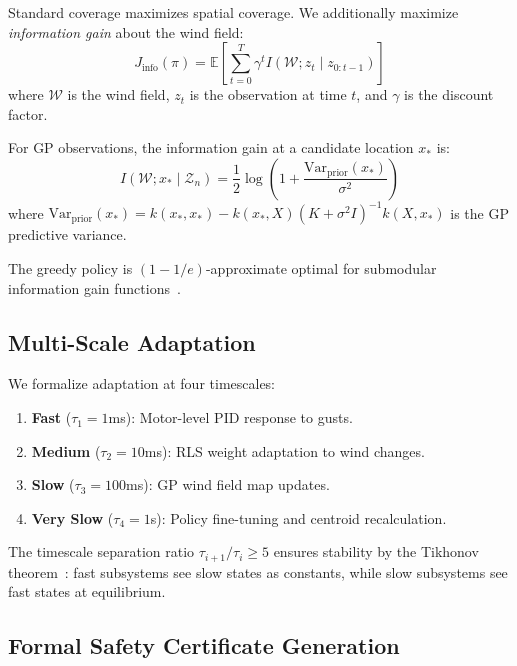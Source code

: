 \documentclass[11pt,twocolumn]{article}
\theoremstyle{definition}
\newcommand{\EE}{\mathbb{E}}
\newcommand{\cW}{\mathcal{W}}
\newcommand{\cZ}{\mathcal{Z}}
\begin{document}
Standard coverage maximizes spatial coverage. We additionally maximize \emph{information gain} about the wind field:
\begin{equation}
\label{eq:info_objective}
J_{\text{info}}(\pi) = \EE\left[\sum_{t=0}^{T} \gamma^t I(\cW; z_t \mid z_{0:t-1})\right]
\end{equation}
where $\cW$ is the wind field, $z_t$ is the observation at time $t$, and $\gamma$ is the discount factor.

For GP observations, the information gain at a candidate location $x_*$ is:
\begin{equation}
I(\cW; x_* \mid \cZ_n) = \frac{1}{2}\log\left(1 + \frac{\text{Var}_{\text{prior}}(x_*)}{\sigma^2}\right)
\end{equation}
where $\text{Var}_{\text{prior}}(x_*) = k(x_*, x_*) - k(x_*, X)(K + \sigma^2 I)^{-1}k(X, x_*)$ is the GP predictive variance.

The greedy policy is $(1-1/e)$-approximate optimal for submodular information gain functions~\citep{Krause2008}.

\subsection{Multi-Scale Adaptation}
\label{sec:multiscale}

We formalize adaptation at four timescales:
\begin{enumerate}[leftmargin=*, label=\textbf{S\arabic*}]
    \item \textbf{Fast} ($\tau_1 = 1$ms): Motor-level PID response to gusts.
    \item \textbf{Medium} ($\tau_2 = 10$ms): RLS weight adaptation to wind changes.
    \item \textbf{Slow} ($\tau_3 = 100$ms): GP wind field map updates.
    \item \textbf{Very Slow} ($\tau_4 = 1$s): Policy fine-tuning and centroid recalculation.
\end{enumerate}

The timescale separation ratio $\tau_{i+1}/\tau_i \geq 5$ ensures stability by the Tikhonov theorem~\citep{Khalil2002}: fast subsystems see slow states as constants, while slow subsystems see fast states at equilibrium.

\subsection{Formal Safety Certificate Generation}
\label{sec:formal}
\end{document}
